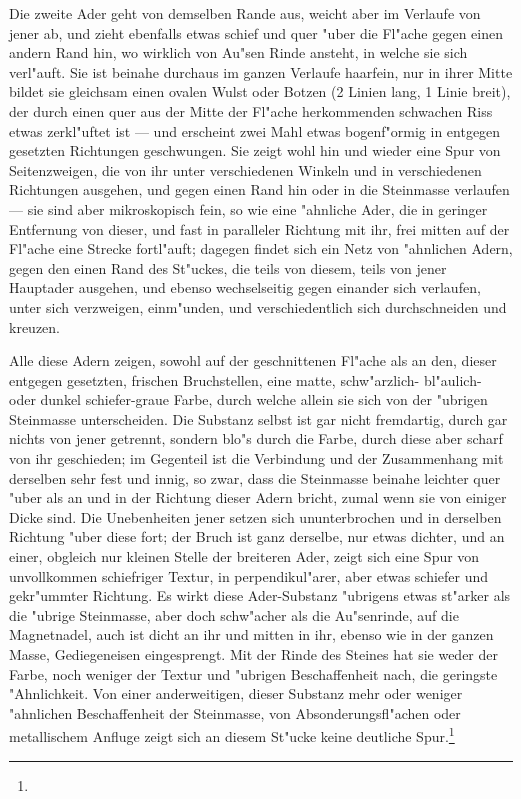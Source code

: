 \documentclass[a4paper, 11pt, oneside, german]{article}
\begin{document}
Die zweite Ader geht von demselben Rande aus, weicht aber im Verlaufe von jener ab, und zieht ebenfalls etwas schief und quer "uber die Fl"ache gegen einen andern Rand hin, wo wirklich von Au"sen Rinde ansteht, in welche sie sich verl"auft. Sie ist beinahe durchaus im ganzen Verlaufe haarfein, nur in ihrer Mitte bildet sie gleichsam einen ovalen Wulst oder Botzen (2 Linien lang, 1 Linie breit), der durch einen quer aus der Mitte der Fl"ache herkommenden schwachen Riss etwas zerkl"uftet ist --- und erscheint zwei Mahl etwas bogenf"ormig in entgegen gesetzten Richtungen geschwungen. Sie zeigt wohl hin und wieder eine Spur von Seitenzweigen, die von ihr unter verschiedenen Winkeln und in verschiedenen Richtungen ausgehen, und gegen einen Rand hin oder in die Steinmasse verlaufen --- sie sind aber mikroskopisch fein, so wie eine "ahnliche Ader, die in geringer Entfernung von dieser, und fast in paralleler Richtung mit ihr, frei mitten auf der Fl"ache eine Strecke fortl"auft; dagegen findet sich ein Netz von "ahnlichen Adern, gegen den einen Rand des St"uckes, die teils von diesem, teils von jener Hauptader ausgehen, und ebenso wechselseitig gegen einander sich verlaufen, unter sich verzweigen, einm"unden, und verschiedentlich sich durchschneiden und kreuzen.

Alle diese Adern zeigen, sowohl auf der geschnittenen Fl"ache als an den, dieser entgegen gesetzten, frischen Bruchstellen, eine matte, schw"arzlich- bl"aulich- oder dunkel schiefer-graue Farbe, durch welche allein sie sich von der "ubrigen Steinmasse unterscheiden. Die Substanz selbst ist gar nicht fremdartig, durch gar nichts von jener getrennt, sondern blo"s durch die Farbe, durch diese aber scharf von ihr geschieden; im Gegenteil ist die Verbindung und der Zusammenhang mit derselben sehr fest und innig, so zwar, dass die Steinmasse beinahe leichter quer "uber als an und in der Richtung dieser Adern bricht, zumal wenn sie von einiger Dicke sind. Die Unebenheiten jener setzen sich ununterbrochen und in derselben Richtung "uber diese fort; der Bruch ist ganz derselbe, nur etwas dichter, und an einer, obgleich nur kleinen Stelle der breiteren Ader, zeigt sich eine Spur von unvollkommen schiefriger Textur, in perpendikul"arer, aber etwas schiefer und gekr"ummter Richtung. Es wirkt diese Ader-Substanz "ubrigens etwas st"arker als die "ubrige Steinmasse, aber doch schw"acher als die Au"senrinde, auf die Magnetnadel, auch ist dicht an ihr und mitten in ihr, ebenso wie in der ganzen Masse, Gediegeneisen eingesprengt. Mit der Rinde des Steines hat sie weder der Farbe, noch weniger der Textur und "ubrigen Beschaffenheit nach, die geringste "Ahnlichkeit. Von einer anderweitigen, dieser Substanz mehr oder weniger "ahnlichen Beschaffenheit der Steinmasse, von Absonderungsfl"achen oder metallischem Anfluge zeigt sich an diesem St"ucke keine deutliche Spur.\footnote{}
\end{document}
